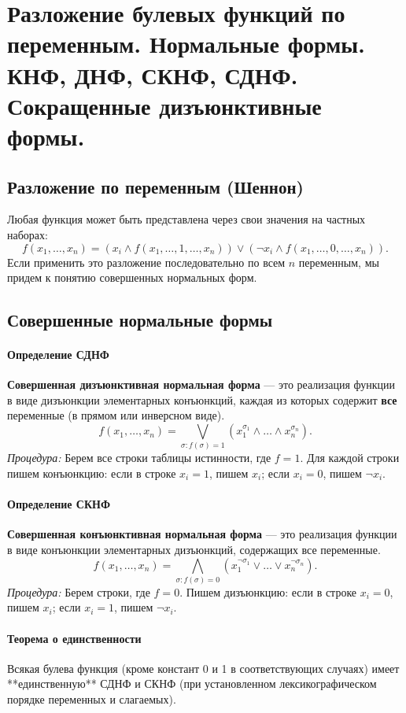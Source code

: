 \section{Разложение булевых функций по переменным. Нормальные формы. КНФ, ДНФ, СКНФ, СДНФ. Сокращенные дизъюнктивные формы.}

\subsection*{Разложение по переменным (Шеннон)}
Любая функция может быть представлена через свои значения на частных наборах:
$$f(x_1, \dots, x_n) = (x_i \land f(x_1, \dots, 1, \dots, x_n)) \lor (\neg x_i \land f(x_1, \dots, 0, \dots, x_n)).$$
Если применить это разложение последовательно по всем $n$ переменным, мы придем к понятию совершенных нормальных форм.

\subsection*{Совершенные нормальные формы}

\paragraph{Определение СДНФ}
\textbf{Совершенная дизъюнктивная нормальная форма} — это реализация функции в виде дизъюнкции элементарных конъюнкций, каждая из которых содержит \textbf{все} переменные (в прямом или инверсном виде).
$$f(x_1, \dots, x_n) = \bigvee_{\sigma: f(\sigma)=1} (x_1^{\sigma_1} \land \dots \land x_n^{\sigma_n}).$$
\textit{Процедура:} Берем все строки таблицы истинности, где $f=1$. Для каждой строки пишем конъюнкцию: если в строке $x_i=1$, пишем $x_i$; если $x_i=0$, пишем $\neg x_i$.

\paragraph{Определение СКНФ}
\textbf{Совершенная конъюнктивная нормальная форма} — это реализация функции в виде конъюнкции элементарных дизъюнкций, содержащих все переменные.
$$f(x_1, \dots, x_n) = \bigwedge_{\sigma: f(\sigma)=0} (x_1^{\neg\sigma_1} \lor \dots \lor x_n^{\neg\sigma_n}).$$
\textit{Процедура:} Берем строки, где $f=0$. Пишем дизъюнкцию: если в строке $x_i=0$, пишем $x_i$; если $x_i=1$, пишем $\neg x_i$.

\paragraph{Теорема о единственности}
Всякая булева функция (кроме констант 0 и 1 в соответствующих случаях) имеет **единственную** СДНФ и СКНФ (при установленном лексикографическом порядке переменных и слагаемых).

